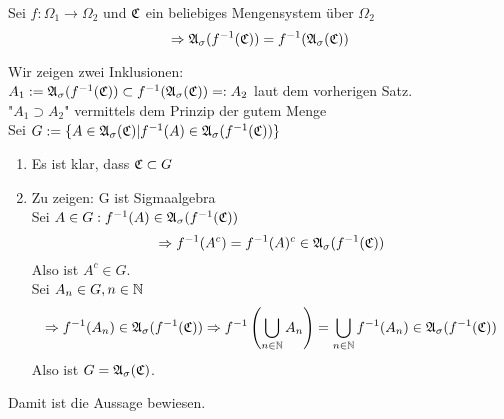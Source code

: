 		\begin{satz}
			Sei $ f:\Omega_1 \to \Omega_2 $ und $\mathfrak{C}$ ein beliebiges Mengensystem über $\Omega_2$
			\[ \Rightarrow \mathfrak{A}_\sigma(f^{-1}(\mathfrak{C})) = f^{-1}(\mathfrak{A}_\sigma(\mathfrak{C})) \]
		\end{satz}
		\begin{bew}
			Wir zeigen zwei Inklusionen:\\
			$ A_1:= \mathfrak{A}_\sigma(f^{-1}(\mathfrak{C})) \subset f^{-1}(\mathfrak{A}_\sigma(\mathfrak{C})) =: A_2$ laut dem vorherigen Satz.\\
			"$ A_1 \supset A_2 $" vermittels dem Prinzip der gutem Menge\\
			Sei $G:=\{ A \in \mathfrak{A}_\sigma(\mathfrak{C})| f^{-1}(A) \in \mathfrak{A}_\sigma(f^{-1}(\mathfrak{C})) \}$
			\begin{enumerate}[1.]
				\item Es ist klar, dass $\mathfrak{C} \subset G$
				\item Zu zeigen: G ist Sigmaalgebra \\
					Sei $A \in G: f^{-1}(A) \in \mathfrak{A}_\sigma(f^{-1}(\mathfrak{C})) $
					\[\Rightarrow f^{-1}(A^c) = f^{-1}(A)^c \in  \mathfrak{A}_\sigma(f^{-1}(\mathfrak{C}))\]
					Also ist $A^c \in G$. \\
					Sei $A_n \in G, n \in \mathbb{N}$
					\[ \Rightarrow f^{-1} (A_n) \in  \mathfrak{A}_\sigma(f^{-1}(\mathfrak{C})) \Rightarrow f^{-1} \left ( \bigcup_{n \in \mathbb{N}} A_n \right ) = \bigcup_ {n \in \mathbb{N}} f^{-1}(A_n) \in  \mathfrak{A}_\sigma(f^{-1}(\mathfrak{C})) \]
					Also ist $G=\mathfrak{A}_\sigma(\mathfrak{C})$.
			\end{enumerate}
			Damit ist die Aussage bewiesen.
		\end{bew}
				
